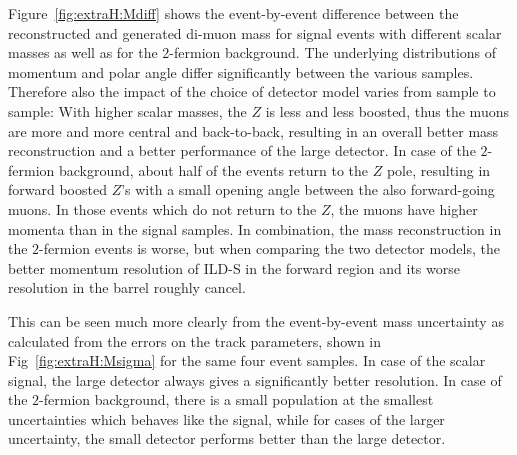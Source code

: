 Figure~\ref{fig:extraH:Mdiff} shows the event-by-event difference between the reconstructed and generated di-muon mass for signal events with different scalar masses as well as for the 2-fermion background. The underlying distributions of momentum and polar angle differ significantly between the various samples. Therefore also the impact of the choice of detector model varies from sample to sample: With higher scalar masses, the $Z$ is less and less boosted, thus the muons are more and more central and back-to-back, resulting in an overall better mass reconstruction and a better performance of the large detector. In case of the $2$-fermion background, about half of the events return to the $Z$ pole, resulting in forward boosted $Z$'s with a small opening angle between the also forward-going muons. In those events which do not return to the $Z$, the muons have higher momenta than in the
signal samples. In combination, the mass reconstruction in the $2$-fermion events is worse, but when comparing
the two detector models, the better momentum resolution of ILD-S in the forward region and its worse resolution
in the barrel roughly cancel.




This can be seen much more clearly from the event-by-event mass uncertainty as calculated from the errors on 
the track parameters, shown in Fig~\ref{fig:extraH:Msigma} for the same four event samples. In case of the scalar
signal, the large detector always gives a significantly better resolution. In case of the $2$-fermion background, there is a small population at the smallest uncertainties which behaves like the signal, while for cases of the larger uncertainty, the small detector performs better than the large detector.

